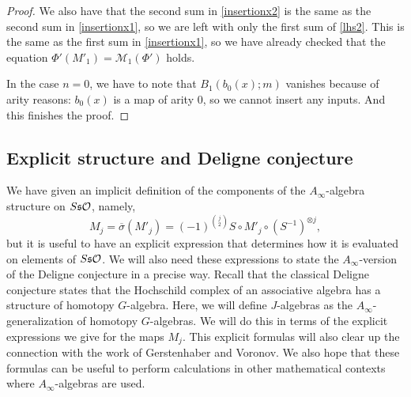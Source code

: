 \documentclass[Thesis.tex]{subfiles}
\begin{document}
\begin{proof}
 We also have that the second sum in \cref{insertionx2} is the same as the second sum in \cref{insertionx1}, so we are left with only the first sum of \cref{lhs2}. This is the same as the first sum in \cref{insertionx1}, so we have already checked that the equation $\Phi'(M'_1)=\mathcal{M}_1(\Phi')$ holds. 
  
 In the case $n=0$, we have to note that $B_1(b_0(x);m)$ vanishes because of arity reasons: $b_0(x)$ is a map of arity 0, so we cannot insert any inputs. And this finishes the proof.
 \end{proof}
 
 \subsection{Explicit structure and Deligne conjecture}\label{sect4}


We have given an implicit definition of the components of the $A_\infty$-algebra structure on $S\mathfrak{s}{\mathcal O}$, namely, \[M_j=\overline{\sigma}(M'_j)=(-1)^{\binom{j}{2}}S\circ M'_j\circ(S^{-1})^{\otimes j},\]
but it is useful to have an explicit expression that determines how it is evaluated on elements of $S\mathfrak{s}{\mathcal O}$. We will also need these expressions to state the $A_\infty$-version of the Deligne conjecture in a precise way. Recall that the classical Deligne conjecture \cite{GV} states that the Hochschild complex of an associative algebra has a structure of homotopy $G$-algebra. Here, we will define $J$-algebras as the $A_\infty$-generalization of homotopy $G$-algebras. We will do this in terms of the explicit expressions we give for the maps $M_j$. This explicit formulas will also clear up the connection with the work of Gerstenhaber and Voronov. We also hope that these formulas can be useful to perform calculations in other mathematical contexts where $A_\infty$-algebras are used.
\end{document}
